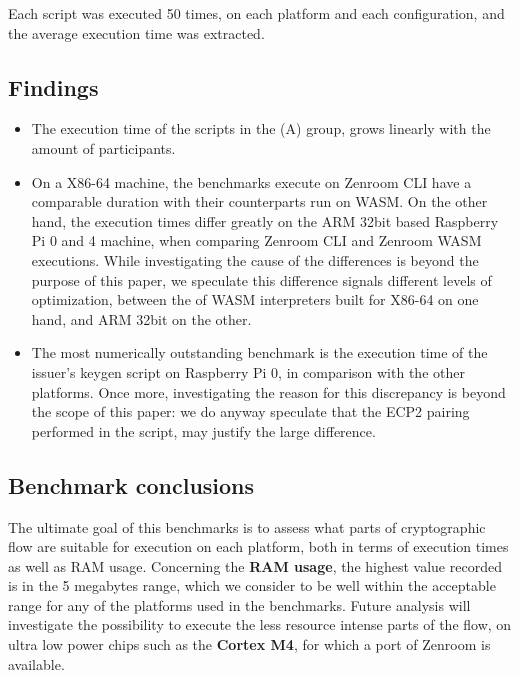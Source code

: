 \documentclass[twocolumn]{article}
\begin{document}
Each script was executed 50 times, on each platform and each configuration, and the average execution time was extracted. 



\subsection*{Findings}

\begin{itemize}
\item The execution time of the scripts in the (A) group, grows linearly with the amount of participants. 

\item On a X86-64 machine, the benchmarks execute on Zenroom CLI have a comparable duration with their counterparts run on WASM. On the other hand, the execution times differ greatly on the ARM 32bit based Raspberry Pi 0 and 4 machine, when comparing Zenroom CLI and Zenroom WASM executions. 
While investigating the cause of the differences is beyond the purpose of this paper, we speculate this difference signals different levels of optimization, between the of WASM interpreters built for X86-64 on one hand, and ARM 32bit on the other.  

\item The most numerically outstanding benchmark is the execution time of the issuer's keygen script on Raspberry Pi 0, in comparison with the other platforms. Once more, investigating the reason for this discrepancy is beyond the scope of this paper: we do anyway speculate that the ECP2 pairing performed in the script, may justify the large difference.
\end{itemize}

\subsection*{Benchmark conclusions} 

The ultimate goal of this benchmarks is to assess what parts of cryptographic flow are suitable for execution on each platform, both in terms of execution times as well as RAM usage. Concerning the \textbf{RAM usage}, the highest value recorded is in the 5 megabytes range, which we consider to be well within the acceptable range for any of the platforms used in the benchmarks. Future analysis will investigate the possibility to execute the less resource intense parts of the flow, on ultra low power chips such as the \textbf{Cortex M4}, for which a port of Zenroom is available.
\end{document}
